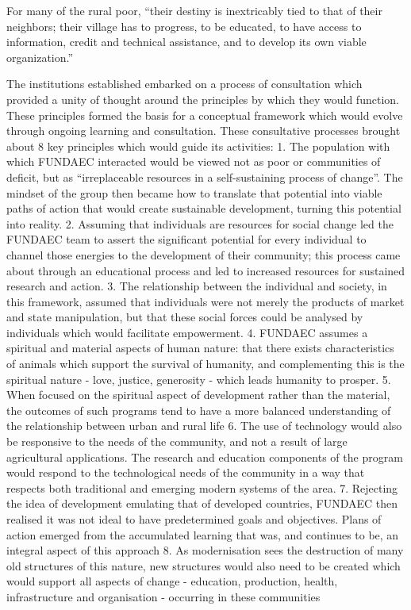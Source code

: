 For many of the rural poor, “their destiny is inextricably tied to that of their neighbors; their village has to progress, to be educated, to have access to information, credit and technical assistance, and to develop its own viable organization.” \citep{Arbab1988}

The institutions established embarked on a process of consultation which provided a unity of thought around the principles by which they would function. These principles formed the basis for a conceptual framework which would evolve through ongoing learning and consultation. These consultative processes brought about 8 key principles which would guide its activities: 
1. The population with which FUNDAEC interacted would be viewed not as poor or communities of deficit, but as “irreplaceable resources in a self-sustaining process of change”. The mindset of the group then became how to translate that potential into viable paths of action that would create sustainable development, turning this potential into reality.
2. Assuming that individuals are resources for social change led the FUNDAEC team to assert the significant potential for every individual to channel those energies to the development of their community; this process came about through an educational process and led to increased resources for sustained research and action.
3. The relationship between the individual and society, in this framework, assumed that individuals were not merely the products of market and state manipulation, but that these social forces could be analysed by individuals which would facilitate empowerment.
4. FUNDAEC assumes a spiritual and material aspects of human nature: that there exists characteristics of animals which support the survival of humanity, and complementing this is the spiritual nature - love, justice, generosity - which leads humanity to prosper.
5. When focused on the spiritual aspect of development rather than the material, the outcomes of such programs tend to have a more balanced understanding of the relationship between urban and rural life
6. The use of technology would also be responsive to the needs of the community, and not a result of large agricultural applications. The research and education components of the program would respond to the technological needs of the community in a way that respects both traditional and emerging modern systems of the area.
7. Rejecting the idea of development emulating that of developed countries, FUNDAEC then realised it was not ideal to have predetermined goals and objectives. Plans of action emerged from the accumulated learning that was, and continues to be, an integral aspect of this approach
8. As modernisation sees the destruction of many old structures of this nature, new structures would also need to be created which would support all aspects of change - education, production, health, infrastructure and organisation - occurring in these communities  \citep{Arbab1988}

